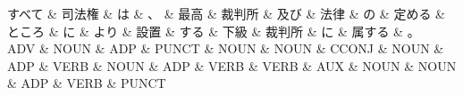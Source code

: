 \documentclass[tikz,border=5pt]{standalone}
\begin{document}
\normalsize
\begin{dependency}[edge unit distance=12.0pt]
    \begin{deptext}[column sep=1em]
        すべて \& 司法権 \& は \& 、 \& 最高 \& 裁判所 \& 及び \& 法律 \& の \& 定める \& ところ \& に \& より \& 設置 \& する \& 下級 \& 裁判所 \& に \& 属する \& 。\\
        ADV \& NOUN \& ADP \& PUNCT \& NOUN \& NOUN \& CCONJ \& NOUN \& ADP \& VERB \& NOUN \& ADP \& VERB \& VERB \& AUX \& NOUN \& NOUN \& ADP \& VERB \& PUNCT\\
    \end{deptext}
\end{dependency}
\end{document}
